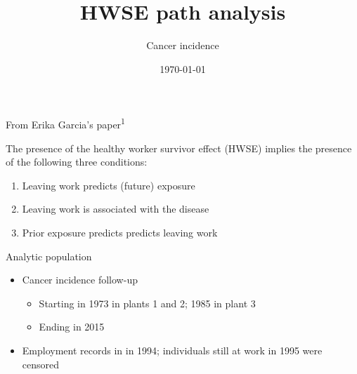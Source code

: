 \documentclass[
  10pt,
  ignorenonframetext,
]{beamer}
\title{HWSE path analysis}
\subtitle{Cancer incidence}
\author{}
\date{\vspace{-2.5em}\today}
\providecommand{\tightlist}{%
  \setlength{\itemsep}{0pt}\setlength{\parskip}{0pt}}
\begin{document}
\frame{\titlepage}

\begin{frame}{From Erika Garcia's paper\textsuperscript{1}}
\protect\hypertarget{from-erika-garcias-papergarcia_2017}{}

\begin{figure}[H]\begin{center}
\end{center}
\end{figure}

The presence of the healthy worker survivor effect (HWSE) implies the
presence of the following three conditions:

\begin{enumerate}
\tightlist
\item
  Leaving work predicts (future) exposure
\item
  Leaving work is associated with the disease
\item
  Prior exposure predicts predicts leaving work
\end{enumerate}

\end{frame}

\begin{frame}{Analytic population}
\protect\hypertarget{analytic-population}{}

\begin{itemize}
\tightlist
\item
  Cancer incidence follow-up

  \begin{itemize}
  \tightlist
  \item
    Starting in 1973 in plants 1 and 2; 1985 in plant 3
  \item
    Ending in 2015
  \end{itemize}
\item
  Employment records in in 1994; individuals still at work in 1995 were
  censored
\end{itemize}

\end{frame}
\end{document}
